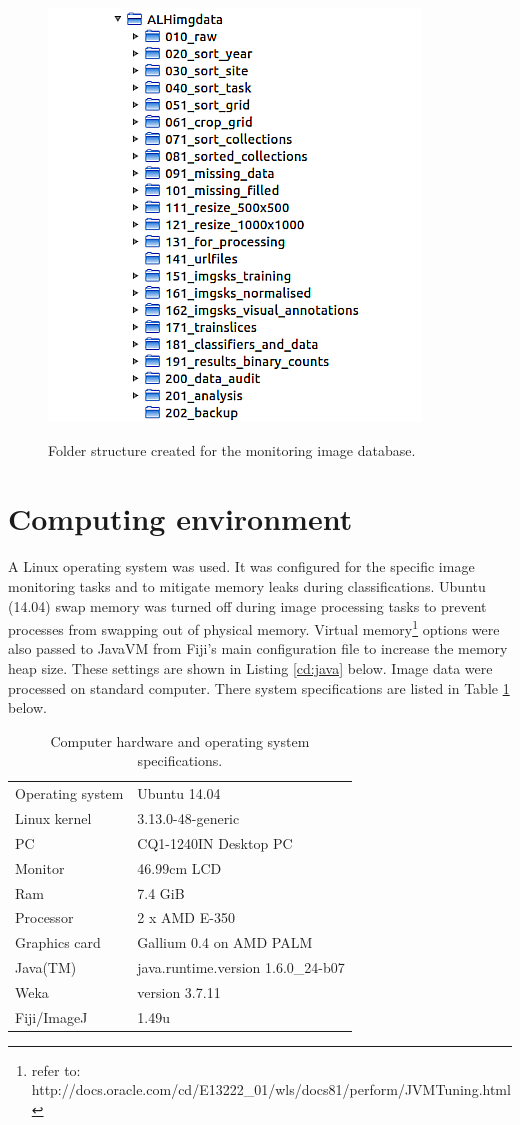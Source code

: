\begin{figure}[!htbp]\myfloatalign
\includegraphics[width=.6\linewidth]{gfx5/prep/folder}\\
\caption[Folder structure for image database.]{Folder structure created for the monitoring image database.}\label{fig:folder}
\end{figure}

\section{Computing environment}
A Linux operating system was used. It was configured for the specific image monitoring tasks and to mitigate memory leaks during classifications. Ubuntu (14.04) swap memory was turned off during image processing tasks to prevent processes from swapping out of physical memory. Virtual memory\footnote{refer to: http://docs.oracle.com/cd/E13222\_01/wls/docs81/perform/JVMTuning.html} options were also passed to JavaVM from \acs{Fiji}'s main configuration file to increase the memory heap size. These settings are shown in Listing \ref{cd:java} below. Image data were processed on standard computer. There system specifications are listed in Table \ref{tab:pcspecs} below.

\begin{table}[!htbp] \myfloatalign \caption[Computer specifications.]{Computer hardware and operating system specifications.}\label{tab:pcspecs} 
\begin{tabular}{p{2.1in}p{2.3in}} \\ \toprule
Operating system & Ubuntu 14.04\\
Linux kernel & 3.13.0-48-generic\\
PC & CQ1-1240IN Desktop PC \\
Monitor & 46.99cm LCD\\
Ram & 7.4 GiB\\
Processor&  2 x AMD E-350\\
Graphics card &  Gallium 0.4 on AMD PALM\\
Java(TM) & java.runtime.version 1.6.0\_24-b07\\
\acs{Weka} & version	3.7.11\\
Fiji/ImageJ & 1.49u \\ \bottomrule
\end{tabular}
\end{table}

